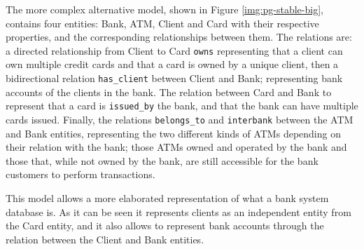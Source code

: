 
The more complex alternative model, shown in Figure \ref{img:pg-stable-big}, contains four entities: Bank, ATM, Client and Card with their respective properties, and the corresponding relationships between them. The relations are: a directed relationship from Client to Card \texttt{owns} representing that a client can own multiple credit cards and that a card is owned by a unique client, then a bidirectional relation \texttt{has\_client} between Client and Bank; representing bank accounts of the clients in the bank. The relation between Card and Bank to represent that a card is \texttt{issued\_by} the bank, and that the bank can have multiple cards issued. Finally, the relations \texttt{belongs\_to} and \texttt{interbank} between the ATM and Bank entities, representing the two different kinds of ATMs depending on their relation with the bank; those ATMs owned and operated by the bank and those that, while not owned by the bank, are still accessible for the bank customers to perform transactions.

This model allows a more elaborated representation of what a bank system database is. As it can be seen it represents clients as an independent entity from the Card entity, and it also allows to represent bank accounts through the relation between the Client and Bank entities. 

